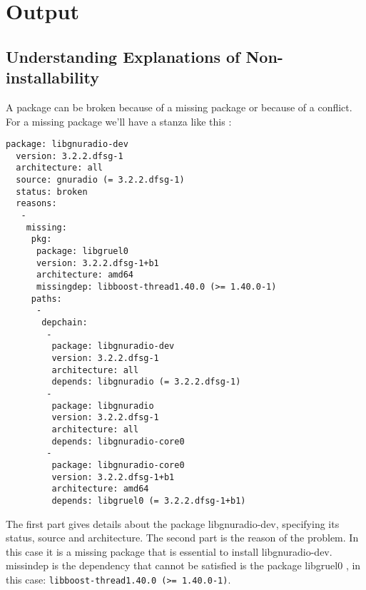 
\section{Output}
\label{sec:output}

\subsection{Understanding Explanations of Non-installability}

A package can be broken because of a missing package or because of a
conflict. For a missing package we'll have a stanza like this :

\begin{verbatim}
package: libgnuradio-dev
  version: 3.2.2.dfsg-1
  architecture: all
  source: gnuradio (= 3.2.2.dfsg-1)
  status: broken
  reasons:
   -
    missing:
     pkg:
      package: libgruel0
      version: 3.2.2.dfsg-1+b1
      architecture: amd64
      missingdep: libboost-thread1.40.0 (>= 1.40.0-1)
     paths:
      -
       depchain:
        -
         package: libgnuradio-dev
         version: 3.2.2.dfsg-1
         architecture: all
         depends: libgnuradio (= 3.2.2.dfsg-1)
        -
         package: libgnuradio
         version: 3.2.2.dfsg-1
         architecture: all
         depends: libgnuradio-core0
        -
         package: libgnuradio-core0
         version: 3.2.2.dfsg-1+b1
         architecture: amd64
         depends: libgruel0 (= 3.2.2.dfsg-1+b1)
\end{verbatim}

The first part gives details about the package libgnuradio-dev, specifying its
status, source and architecture. The second part is the reason of the problem.
In this case it is a missing package that is essential to install
libgnuradio-dev. missindep is the dependency that cannot be satisfied is the
package libgruel0 , in this case: {\tt libboost-thread1.40.0 (>= 1.40.0-1)}.


